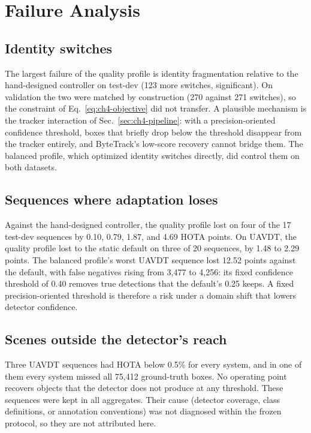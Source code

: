 \section{Failure Analysis}\label{sec:ch4-failure}

\subsection{Identity switches}
The largest failure of the quality profile is identity fragmentation relative to the hand-designed controller on test-dev (123 more switches, significant). On validation the two were matched by construction (270 against 271 switches), so the constraint of Eq.~\eqref{eq:ch4-objective} did not transfer. A plausible mechanism is the tracker interaction of Sec.~\ref{sec:ch4-pipeline}: with a precision-oriented confidence threshold, boxes that briefly drop below the threshold disappear from the tracker entirely, and ByteTrack's low-score recovery cannot bridge them. The balanced profile, which optimized identity switches directly, did control them on both datasets.

\subsection{Sequences where adaptation loses}
Against the hand-designed controller, the quality profile lost on four of the 17 test-dev sequences by 0.10, 0.79, 1.87, and 4.69 HOTA points. On UAVDT, the quality profile lost to the static default on three of 20 sequences, by 1.48 to 2.29 points. The balanced profile's worst UAVDT sequence lost 12.52 points against the default, with false negatives rising from 3,477 to 4,256: its fixed confidence threshold of 0.40 removes true detections that the default's 0.25 keeps. A fixed precision-oriented threshold is therefore a risk under a domain shift that lowers detector confidence.

\subsection{Scenes outside the detector's reach}
Three UAVDT sequences had HOTA below 0.5\% for every system, and in one of them every system missed all 75,412 ground-truth boxes. No operating point recovers objects that the detector does not produce at any threshold. These sequences were kept in all aggregates. Their cause (detector coverage, class definitions, or annotation conventions) was not diagnosed within the frozen protocol, so they are not attributed here.

